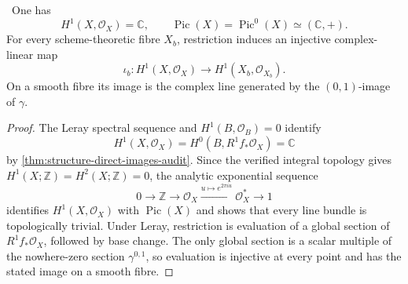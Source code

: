 \begin{corollary}
\label{cor:picard-line-audit}
\Verified\ One has
\[
 H^1(X,\mathcal O_X)=\mathbb C,\qquad
 \operatorname{Pic}(X)=\operatorname{Pic}^0(X)\simeq(\mathbb C,+).
\tag{9.17}
\]
For every scheme-theoretic fibre \(X_b\), restriction induces an injective
complex-linear map
\[
 \iota_b:H^1(X,\mathcal O_X)\longrightarrow
 H^1(X_b,\mathcal O_{X_b}).
\tag{9.18}
\]
On a smooth fibre its image is the complex line generated by the
\((0,1)\)-image of \(\gamma\).
\end{corollary}

\begin{proof}
The Leray spectral sequence and \(H^1(B,\mathcal O_B)=0\) identify
\[
 H^1(X,\mathcal O_X)=H^0(B,R^1f_*\mathcal O_X)=\mathbb C
\]
by \cref{thm:structure-direct-images-audit}.  Since the verified integral
topology gives \(H^1(X;\mathbb Z)=H^2(X;\mathbb Z)=0\), the analytic
exponential sequence
\[
0\to\mathbb Z\to\mathcal O_X
 \xrightarrow{u\mapsto e^{2\pi iu}}\mathcal O_X^*\to1
\]
identifies \(H^1(X,\mathcal O_X)\) with \(\operatorname{Pic}(X)\) and
shows that every line bundle is topologically trivial.  Under Leray,
restriction is evaluation of a global section of
\(R^1f_*\mathcal O_X\), followed by base change.  The only global section
is a scalar multiple of the nowhere-zero section \(\gamma^{0,1}\), so
evaluation is injective at every point and has the stated image on a
smooth fibre.
\end{proof}
